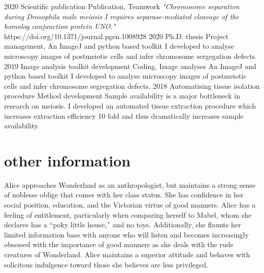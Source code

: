 \documentclass[]{twentysecondcv}
\begin{document}
\begin{twenty}
  \twentyitem
    {2020}
    {Scientific publication}
    {Publication, Teamwork}
    {\emph{"Chromosome separation during Drosophila male meiosis I requires separase-mediated cleavage of the homolog conjunction protein UNO."} https://doi.org/10.1371/journal.pgen.1008928}
  \twentyitem
    {2020}
    {Ph.D. thesis }
    {Project management, }
    {An ImageJ and python based toolkit I developed to analyse microscopy images of postmeiotic cells and infer chromosome sergegation defects.}
  \twentyitem
    {2019}
    {Image analysis toolkit development}
    {Coding, Image analyses}
    {An ImageJ and python based toolkit I developed to analyse microscopy images of postmeiotic cells and infer chromosome segregation defects.}
\twentyitem
    {2018}
    {Automatising tissue isolation procedure}
    {Method development}
    {Sample availability is a major bottleneck in research on meiosis. I developed an automated tissue extraction procedure which increases extraction efficiency 10 fold and thus dramatically increases sample availability.}


\end{twenty}
\section{other information}
Alice approaches Wonderland as an anthropologist, but maintains a strong sense of noblesse oblige that comes with her class status. She has confidence in her social position, education, and the Victorian virtue of good manners. Alice has a feeling of entitlement, particularly when comparing herself to Mabel, whom she declares has a “poky little house,” and no toys. Additionally, she flaunts her limited information base with anyone who will listen and becomes increasingly obsessed with the importance of good manners as she deals with the rude creatures of Wonderland. Alice maintains a superior attitude and behaves with solicitous indulgence toward those she believes are less privileged.

\end{document}

